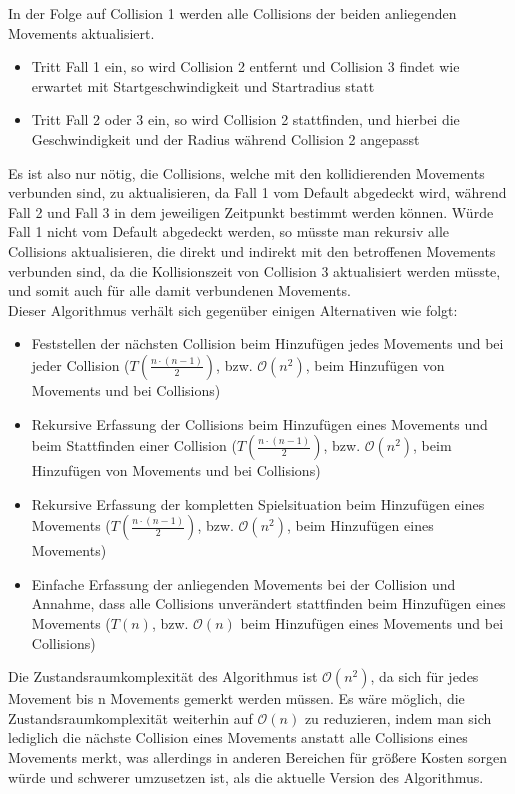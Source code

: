 In der Folge auf Collision 1 werden alle Collisions der beiden anliegenden Movements aktualisiert. \\
\begin{itemize}
	\item Tritt Fall 1 ein, so wird Collision 2 entfernt und Collision 3 findet wie erwartet mit Startgeschwindigkeit und Startradius statt
	\item Tritt Fall 2 oder 3 ein, so wird Collision 2 stattfinden, und hierbei die Geschwindigkeit und der Radius während Collision 2 angepasst
\end{itemize}
Es ist also nur nötig, die Collisions, welche mit den kollidierenden Movements verbunden sind, zu aktualisieren, da Fall 1 vom Default abgedeckt wird, während Fall 2 und Fall 3 in dem jeweiligen Zeitpunkt bestimmt werden können. Würde Fall 1 nicht vom Default abgedeckt werden, so müsste man rekursiv alle Collisions aktualisieren, die direkt und indirekt mit den betroffenen Movements verbunden sind, da die Kollisionszeit von Collision 3 aktualisiert werden müsste, und somit auch für alle damit verbundenen Movements. \\

Dieser Algorithmus verhält sich gegenüber einigen Alternativen wie folgt:
\begin{itemize}
	\item Feststellen der nächsten Collision beim Hinzufügen jedes Movements und bei jeder Collision 
	($T(\frac{n \cdot (n - 1)}{2})$, bzw. $\mathcal{O}(n^2)$, beim Hinzufügen von Movements und bei Collisions)
	\item Rekursive Erfassung der Collisions beim Hinzufügen eines Movements und beim Stattfinden einer Collision 
	($T(\frac{n \cdot (n - 1)}{2})$, bzw. $\mathcal{O}(n^2)$, beim Hinzufügen von Movements und bei Collisions)
	\item Rekursive Erfassung der kompletten Spielsituation beim Hinzufügen eines Movements 
	($T(\frac{n \cdot (n - 1)}{2})$, bzw. $\mathcal{O}(n^2)$, beim Hinzufügen eines Movements)
	\item Einfache Erfassung der anliegenden Movements bei der Collision und Annahme, dass alle Collisions unverändert stattfinden beim Hinzufügen eines Movements 
	($T(n)$, bzw.  $\mathcal{O}(n)$ beim Hinzufügen eines Movements und bei Collisions)
\end{itemize}
Die Zustandsraumkomplexität des Algorithmus ist $\mathcal{O}(n^2)$, da sich für jedes Movement bis n Movements gemerkt werden müssen.
Es wäre möglich, die Zustandsraumkomplexität weiterhin auf $\mathcal{O}(n)$ zu reduzieren, indem man sich lediglich die nächste Collision eines Movements anstatt alle Collisions eines Movements merkt, was allerdings in anderen Bereichen für größere Kosten sorgen würde und schwerer umzusetzen ist, als die aktuelle Version des Algorithmus.